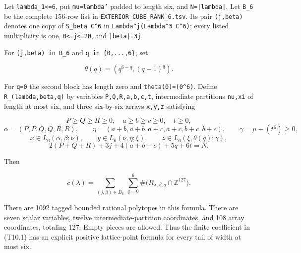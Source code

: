 \documentclass[
  10pt,
]{article}
\begin{document}
Let \texttt{\small lambda\_\allowbreak{}1<=\allowbreak{}6}, put
\texttt{\small mu=\allowbreak{}lambda'} padded to length six, and
\texttt{\small N=\allowbreak{}|lambda|}. Let
\texttt{\small B\_\allowbreak{}6} be the complete 156-row list in
\texttt{\small EXTERIOR\_\allowbreak{}CUBE\_\allowbreak{}RANK\_\allowbreak{}6.tsv}.
Its pair \texttt{\small (\allowbreak{}j,\allowbreak{}beta)\allowbreak{}}
denotes one copy of
\texttt{\small S\_\allowbreak{}beta C\textasciicircum{}6} in
\texttt{\small Lambda\textasciicircum{}j(\allowbreak{}Lambda\textasciicircum{}3 C\textasciicircum{}6)\allowbreak{}};
every listed multiplicity is one,
\texttt{\small 0<=\allowbreak{}j<=\allowbreak{}20}, and
\texttt{\small |beta|=\allowbreak{}3j}.

For
\texttt{\small (\allowbreak{}j,\allowbreak{}beta)\allowbreak{} in B\_\allowbreak{}6}
and \texttt{\small q in \{0,\allowbreak{}...,\allowbreak{}6\}}, set

\[
\theta(q)=(q^{6-q},(q-1)^q).
\tag{T13.1}
\]

For \texttt{\small q=\allowbreak{}0} the second block has length zero
and
\texttt{\small theta(\allowbreak{}0)\allowbreak{}=\allowbreak{}(\allowbreak{}0\textasciicircum{}6)\allowbreak{}}.
Define
\texttt{\small R\_\allowbreak{}(\allowbreak{}lambda,\allowbreak{}beta,\allowbreak{}q)\allowbreak{}}
by variables
\texttt{\small P,\allowbreak{}Q,\allowbreak{}R,\allowbreak{}a,\allowbreak{}b,\allowbreak{}c,\allowbreak{}t},
intermediate partitions \texttt{\small nu,\allowbreak{}xi} of length at
most six, and three six-by-six arrays
\texttt{\small x,\allowbreak{}y,\allowbreak{}z} satisfying

\[
P\ge Q\ge R\ge0,\quad a\ge b\ge c\ge0,\quad t\ge0,
\tag{T13.2}
\] \[
\alpha=(P,P,Q,Q,R,R),\qquad
\eta=(a+b,a+b,a+c,a+c,b+c,b+c),\qquad
\gamma=\mu-(t^6)\ge0,
\tag{T13.3}
\] \[
x\in L_6(\alpha,\beta;\nu),\qquad
y\in L_6(\nu,\eta;\xi),\qquad
z\in L_6(\xi,\theta(q);\gamma),
\tag{T13.4}
\] \[
2(P+Q+R)+3j+4(a+b+c)+5q+6t=N.
\tag{T13.5}
\]

Then

\[
\boxed{c(\lambda)=
\sum_{(j,\beta)\in B_6}\ \sum_{q=0}^{6}
\#\bigl(R_{\lambda,\beta,q}\cap\mathbb Z^{127}\bigr).}
\tag{T13.6}
\]

There are 1092 tagged bounded rational polytopes in this formula. There
are seven scalar variables, twelve intermediate-partition coordinates,
and 108 array coordinates, totaling 127. Empty pieces are allowed. Thus
the finite coefficient in (T10.1) has an explicit positive lattice-point
formula for every tail of width at most six.
\end{document}

